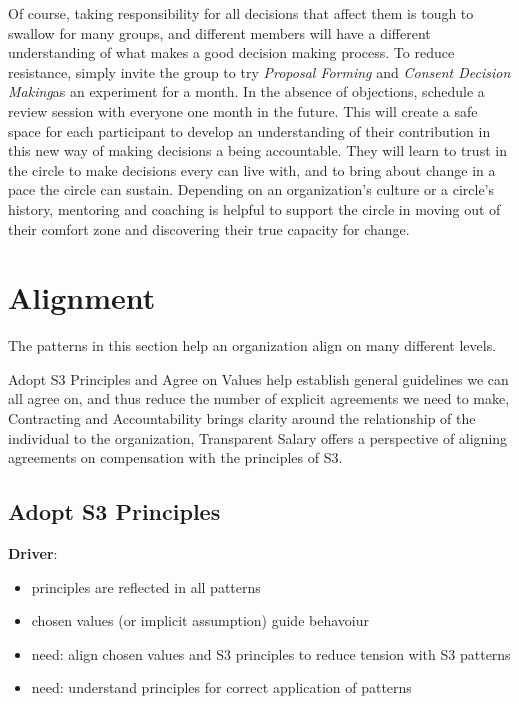 Of course, taking responsibility for all decisions that affect them is tough to swallow for many groups, and different members will have a different understanding of what makes a good decision making process. To reduce resistance, simply invite the group to try \emph{Proposal Forming} and \emph{Consent Decision Making}as an experiment for a month. In the absence of objections, schedule a review session with everyone one month in the future. This will create a safe space for each participant to develop an understanding of their contribution in this new way of making decisions a being accountable. They will learn to trust in the circle to make decisions every can live with, and to bring about change in a pace the circle can sustain. Depending on an organization's culture or a circle's history, mentoring and coaching is helpful to support the circle in moving out of their comfort zone and discovering their true capacity for change.

\chapter{Alignment}
\label{alignment}

The patterns in this section help an organization align on many different levels.

Adopt S3 Principles and Agree on Values help establish general guidelines we can all agree on, and thus reduce the number of explicit agreements we need to make, Contracting and Accountability brings clarity around the relationship of the individual to the organization, Transparent Salary offers a perspective of aligning agreements on compensation with the principles of S3.

\section{Adopt S3 Principles}
\label{adopts3principles}

\textbf{Driver}:

\begin{itemize}
\item principles are reflected in all patterns

\item chosen values (or implicit assumption) guide behavoiur

\item need: align chosen values and S3 principles to reduce tension with S3 patterns

\item need: understand principles for correct application of patterns

\end{itemize}

